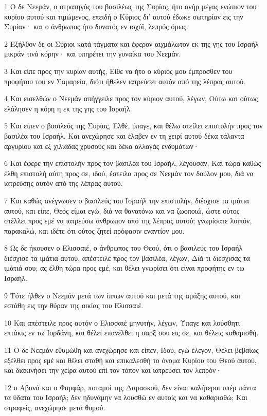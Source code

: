 \par 1 Ο δε Νεεμάν, ο στρατηγός του βασιλέως της Συρίας, ήτο ανήρ μέγας ενώπιον του κυρίου αυτού και τιμώμενος, επειδή ο Κύριος δι' αυτού έδωκε σωτηρίαν εις την Συρίαν· και ο άνθρωπος ήτο δυνατός εν ισχύϊ, λεπρός όμως.
\par 2 Εξήλθον δε οι Σύριοι κατά τάγματα και έφερον αιχμάλωτον εκ της γης του Ισραήλ μικράν τινά κόρην· και υπηρέτει την γυναίκα του Νεεμάν.
\par 3 Και είπε προς την κυρίαν αυτής, Είθε να ήτο ο κύριός μου έμπροσθεν του προφήτου του εν Σαμαρεία, διότι ήθελεν ιατρεύσει αυτόν από της λέπρας αυτού.
\par 4 Και εισελθών ο Νεεμάν απήγγειλε προς τον κύριον αυτού, λέγων, Ούτω και ούτως ελάλησεν η κόρη η εκ της γης του Ισραήλ.
\par 5 Και είπεν ο βασιλεύς της Συρίας, Ελθέ, ύπαγε, και θέλω στείλει επιστολήν προς τον βασιλέα του Ισραήλ. Και ανεχώρησε και έλαβεν εν τη χειρί αυτού δέκα τάλαντα αργυρίου και εξ χιλιάδας χρυσούς και δέκα αλλαγάς ενδυμάτων·
\par 6 Και έφερε την επιστολήν προς τον βασιλέα του Ισραήλ, λέγουσαν, Και τώρα καθώς έλθη επιστολή αύτη προς σε, ιδού, έστειλα προς σε Νεεμάν τον δούλον μου, διά να ιατρεύσης αυτόν από της λέπρας αυτού.
\par 7 Και καθώς ανέγνωσεν ο βασιλεύς του Ισραήλ την επιστολήν, διέσχισε τα ιμάτια αυτού, και είπε, Θεός είμαι εγώ, διά να θανατόνω και να ζωοποιώ, ώστε ούτος στέλλει προς εμέ να ιατρεύσω άνθρωπον από της λέπρας αυτού; γνωρίσατε λοιπόν, παρακαλώ, και ιδέτε ότι ούτος ζητεί πρόφασιν εναντίον μου.
\par 8 Ως δε ήκουσεν ο Ελισσαιέ, ο άνθρωπος του Θεού, ότι ο βασιλεύς του Ισραήλ διέσχισε τα ιμάτια αυτού, απέστειλε προς τον βασιλέα, λέγων, Διά τι διέσχισας τα ιμάτιά σου; ας έλθη τώρα προς εμέ, και θέλει γνωρίσει ότι είναι προφήτης εν τω Ισραήλ.
\par 9 Τότε ήλθεν ο Νεεμάν μετά των ίππων αυτού και μετά της αμάξης αυτού, και εστάθη εις την θύραν της οικίας του Ελισσαιέ.
\par 10 Και απέστειλε προς αυτόν ο Ελισσαιέ μηνυτήν, λέγων, Ύπαγε και λούσθητι επτάκις εν τω Ιορδάνη, και θέλει επανέλθει η σαρξ σου εις σε, και θέλεις καθαρισθή.
\par 11 Ο δε Νεεμάν εθυμώθη και ανεχώρησε και είπεν, Ιδού, εγώ έλεγον, Θέλει βεβαίως εξέλθει προς εμέ και θέλει σταθή και επικαλεσθή το όνομα Κυρίου του Θεού αυτού, και διακινήσει την χείρα αυτού επί τον τόπον και ιατρεύσει τον λεπρόν·
\par 12 ο Αβανά και ο Φαρφάρ, ποταμοί της Δαμασκού, δεν είναι καλήτεροι υπέρ πάντα τα ύδατα του Ισραήλ; δεν ηδυνάμην να λουσθώ εν αυτοίς και να καθαρισθώ; Και στραφείς, ανεχώρησε μετά θυμού.
